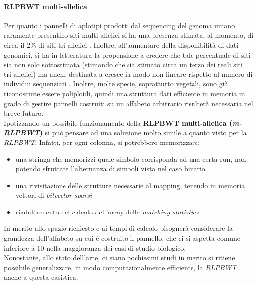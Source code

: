 \paragraph{RLPBWT multi-allelica}
Per quanto i pannelli di aplotipi prodotti dal sequencing del genoma umano
raramente presentino siti multi-allelici si ha una presenza stimata, al momento,
di circa il 2\% di siti tri-allelici \cite{tri}. Inoltre, all'aumentare della
disponibilità di dati genomici, si ha in letteratura la propensione a credere
che tale percentuale di siti sia non solo sottostimata (stimando che sia stimato
circa un terzo dei reali siti tri-allelici) ma anche destinata a
cresce in modo non lineare rispetto al numero di individui sequenziati
\cite{tri2}. Inoltre, molte specie, soprattutto vegetali, sono già riconosciute
essere poliploidi, quindi una struttura dati efficiente in memoria in grado di
gestire pannelli costruiti su un alfabeto arbitrario risulterà necessaria nel
breve futuro.\\
Ipotizzando un possibile funzionamento della \textbf{RLPBWT
  multi-allelica (\textit{m-RLPBWT})} si può pensare ad una soluzione molto
simile a quanto visto per la \textit{RLPBWT}. Infatti, per ogni colonna, si
potrebbero memorizzare:
\begin{itemize}
  \item una stringa che memorizzi quale simbolo corrisponda ad una certa run,
  non potendo sfruttare l'alternanza di simboli vista nel caso binario
  \item una rivisitazione delle strutture necessarie al mapping, tenendo in
  memoria vettori di \textit{bitvector sparsi}
  \item riadattamento del calcolo dell'array delle \textit{matching statistics}
\end{itemize}
In merito allo spazio richiesto e ai tempi di calcolo bisognerà considerare la
grandezza dell'alfabeto su cui è costruito il pannello, che ci si aspetta comune
inferiore a $10$ nella maggioranza dei casi di studio biologico.\\
Nonostante, allo stato dell'arte, ci siano pochissimi studi in merito si ritiene
possibile generalizzare, in modo computazionalmente efficiente, la
\textit{RLPBWT} anche a questa casistica. 

